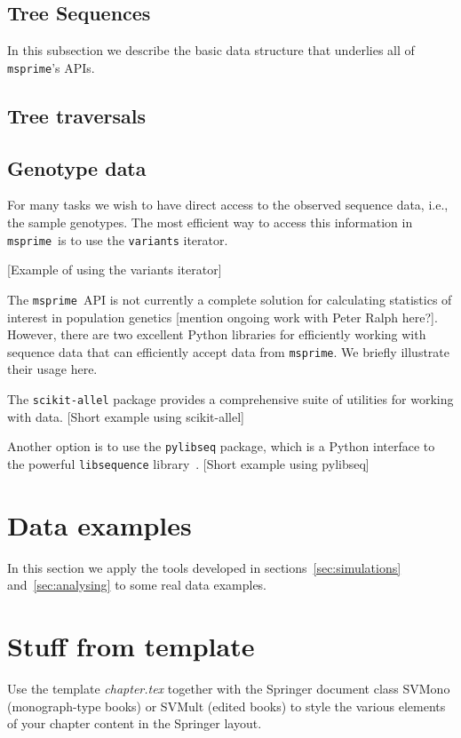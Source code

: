 \documentclass[graybox]{svmult}
\newcommand{\msprime}[0]{\texttt{msprime}}
\newcommand{\apiref}[1]{\texttt{#1}}
\begin{document}
\subsection{Tree Sequences}
\label{sec:tree-sequences}
In this subsection we describe the basic data structure that underlies all of
\msprime's APIs.

\subsection{Tree traversals}
\label{sec:tree-traversals}


\subsection{Genotype data}
\label{sec:sequence-data}
For many tasks we wish to have direct access to the observed sequence
data, i.e., the sample genotypes. The most efficient way to access this
information in \msprime\ is to use the \apiref{variants} iterator.

[Example of using the variants iterator]

The \msprime\ API is not currently a complete solution for calculating
statistics of interest in population genetics [mention ongoing work
with Peter Ralph here?]. However, there are two excellent Python
libraries for efficiently working with sequence data that can efficiently
accept data from \msprime. We briefly illustrate their usage here.

The \texttt{scikit-allel}\citep{miles2017scikit} package provides a
comprehensive suite of utilities for working with data.
[Short example using scikit-allel]

Another option is to use the \texttt{pylibseq} package, which is a
Python interface to the powerful \texttt{libsequence}
library~\citep{thornton2003libsequence}. [Short example using pylibseq]


\section{Data examples}
\label{sec:data-examples}

In this section we apply the tools developed in sections~\ref{sec:simulations}
and~\ref{sec:analysing} to some real data examples.





\clearpage
\appendix
\section{Stuff from template}
\label{sec:1}
Use the template \emph{chapter.tex} together with the Springer document class SVMono (monograph-type books) or SVMult (edited books) to style the various elements of your chapter content in the Springer layout.
\end{document}
